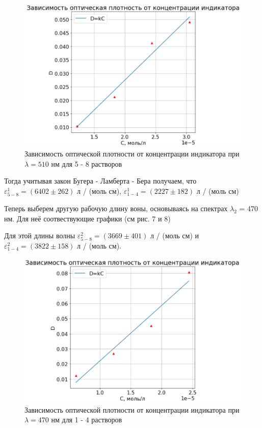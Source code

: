 \documentclass[a4paper,12pt]{article}
\begin{document}
\begin{figure}[H]
    \centering
    \includegraphics[scale=0.75]{5-8.png}
    \centering
    \caption{Зависимость оптической плотности от концентрации индикатора при $\lambda = 510$ нм для 5 - 8 растворов}
\end{figure}
 Тогда учитывая закон Бугера - Ламберта - Бера получаем, что $\varepsilon_{5-8}^1 = (6402 \pm 262)$ л / (моль см), $\varepsilon_{1-4}^1 = (2227 \pm 182)$ л / (моль см)

Теперь выберем другую рабочую длину воны, основываясь на спектрах $\lambda_2$ = 470 нм. Для неё соотвествующие графики (см рис. 7 и 8)

Для этой длины волны $\varepsilon_{5-8}^2 = (3669 \pm 401)$ л / (моль см) и $\varepsilon_{1-4}^2 = (3822 \pm 158)$ л / (моль см). 

\begin{figure}[H]
    \centering
    \includegraphics[scale=0.75]{1-4.2.png}
    \centering
    \caption{Зависимость оптической плотности от концентрации индикатора при $\lambda = 470$ нм для 1 - 4 растворов}
\end{figure}
\end{document}
